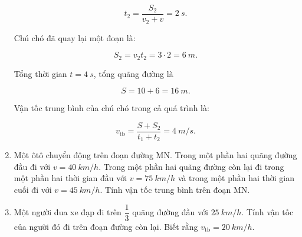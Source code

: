 \begin{enumerate}[label=\bfseries Câu \arabic*:]
{		$$t_2 = \dfrac{S_2}{v_2 + v} = \SI{2}{s}.$$
		
		Chú chó đã quay lại một đoạn là:
		
		$$S_2 = v_2t_2 = 3 \cdot 2 = \SI{6}{m}.$$
		
		Tổng thời gian $t = \SI{4}{s}$, tổng quãng đường là 
		
		$$S = 10 + 6 = \SI{16}{m}.$$
		
		Vận tốc trung bình của chú chó trong cả quá trình là: 
		
		$$v_\text{tb} = \dfrac{S + S_2}{t_1 + t_2} = \SI{4}{m/s}.$$
	}
	\item {}
	
	{
		Một ôtô chuyển động trên đoạn đường MN. Trong một phần hai quãng đường đầu đi với $v = \SI{40}{km/h}$. Trong một phần hai quãng đường còn lại đi trong một phần hai thời gian đầu với $v = \SI{75}{km/h}$ và trong một phần hai thời gian cuối đi với $v = \SI{45}{km/h}$. Tính vận tốc trung bình trên đoạn MN.
	}
	\item {}
	
	{
		
		Một người đua xe đạp đi trên $\dfrac{1}{3}$ quãng đường đầu với $\SI{25}{km/h}$. Tính vận tốc của người đó đi trên đoạn đường còn lại. Biết rằng $v_\text{tb} = \SI{20}{km/h}$.
	}
\end{enumerate}
